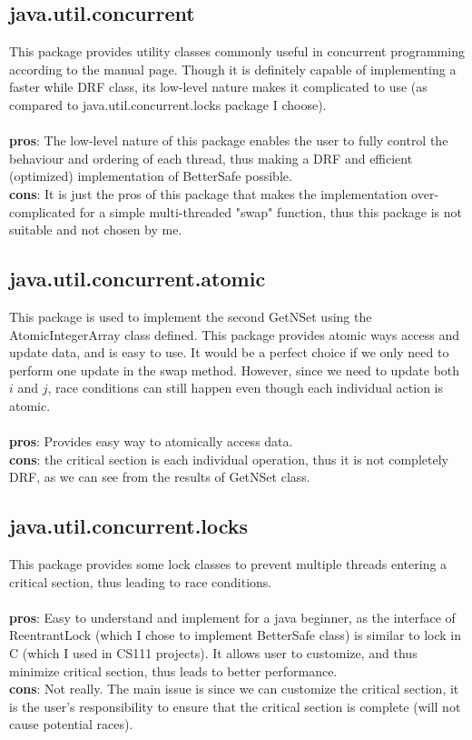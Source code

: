 \documentclass[letterpaper,twocolumn,10pt]{article}
\begin{document}
\subsection{java.util.concurrent}
This package provides utility classes commonly useful in concurrent programming according to the manual page. Though it is definitely capable of implementing a faster while DRF class, its low-level nature makes it complicated to use (as compared to java.util.concurrent.locks package I choose). \\~\\
\textbf{pros}: The low-level nature of this package enables the user to fully control the behaviour and ordering of each thread, thus making a DRF and efficient (optimized) implementation of BetterSafe possible. \\
\textbf{cons}: It is just the pros of this package that makes the implementation over-complicated for a simple multi-threaded "swap" function, thus this package is not suitable and not chosen by me.
\subsection{java.util.concurrent.atomic}
This package is used to implement the second GetNSet using the AtomicIntegerArray class defined. This package provides atomic ways access and update data, and is easy to use. It would be a perfect choice if we only need to perform one update in the swap method. However, since we need to update both $i$ and $j$, race conditions can still happen even though each individual action is atomic. \\~\\
\textbf{pros}: Provides easy way to atomically access data. \\
\textbf{cons}: the critical section is each individual operation, thus it is not completely DRF, as we can see from the results of GetNSet class.
\subsection{java.util.concurrent.locks}
This package provides some lock classes to prevent multiple threads entering a critical section, thus leading to race conditions. \\~\\
\textbf{pros}: Easy to understand and implement for a java beginner, as the interface of ReentrantLock (which I chose to implement BetterSafe class) is similar to lock in C (which I used in CS111 projects). It allows user to customize, and thus minimize critical section, thus leads to better performance.\\
\textbf{cons}: Not really. The main issue is since we can customize the critical section, it is the user's responsibility to ensure that the critical section is complete (will not cause potential races).
\end{document}
